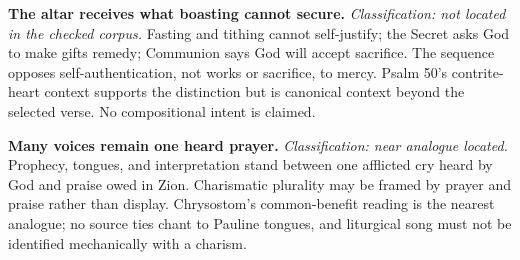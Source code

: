 \noindent\textbf{The altar receives what boasting cannot secure.\enspace{}}
\emph{Classification: not located in the checked corpus.} Fasting and tithing cannot self-justify; the Secret asks God to make gifts remedy; Communion says God will accept sacrifice. The sequence opposes self-authentication, not works or sacrifice, to mercy. Psalm 50's contrite-heart context supports the distinction but is canonical context beyond the selected verse. No compositional intent is claimed.

\noindent\textbf{Many voices remain one heard prayer.\enspace{}}
\emph{Classification: near analogue located.} Prophecy, tongues, and interpretation stand between one afflicted cry heard by God and praise owed in Zion. Charismatic plurality may be framed by prayer and praise rather than display. Chrysostom's common-benefit reading is the nearest analogue; no source ties chant to Pauline tongues, and liturgical song must not be identified mechanically with a charism.

